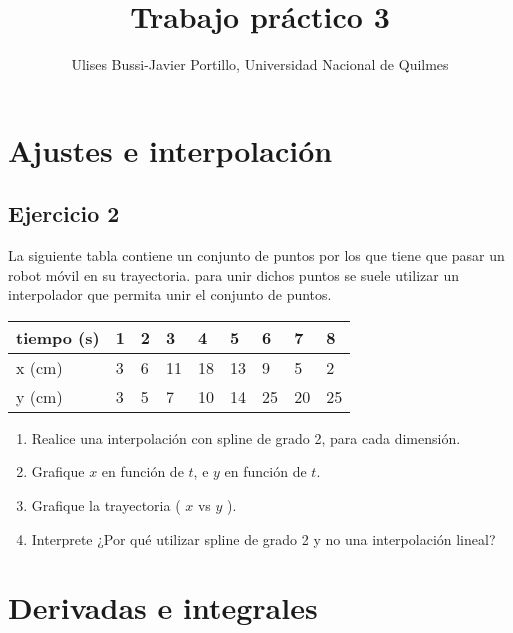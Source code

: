 \documentclass[a4paper,11pt]{article}
\makeatletter
\theoremstyle{mytheor}
\renewcommand{\maketitle}{
\colorbox{gray!20}{\framebox[\linewidth]{ \huge \textsc{\@title} } 
\lfoot{\@title}
}

}
\makeatother
\begin{document}
\title{Trabajo práctico 3}

\author{Ulises Bussi-Javier Portillo, Universidad Nacional de Quilmes}


\maketitle \vspace{20pt}

\section*{Ajustes e interpolación}

\subsection*{Ejercicio 2}
La siguiente tabla contiene un conjunto de puntos por los que tiene que pasar
un robot móvil en su trayectoria. para unir dichos puntos se suele utilizar
un interpolador que permita unir el conjunto de puntos. 

\begin{table}[h!]
\centering
\begin{tabular}{l|llllllll}
 \hline
 tiempo (s)   & 1	 &  2    &  3   &  4    &  5    &   6   &   7   &  8     \\ \hline
 x (cm) 	  & 3    &  6    &  11  &  18   & 13    &   9   &   5   &  2    \\ \hline
 y (cm) 	  & 3    &  5    &  7  &  10   & 14    &   25   &  20   &  25    \\ \hline
\end{tabular}
\end{table}


\begin{enumerate}[label=\alph*)]
  \item Realice una interpolación con spline de grado 2, para cada dimensión.
  \item Grafique $x$ en función de $t$, e $y$ en función de $t$.
  \item Grafique la trayectoria  ( $x$ vs $y$ ).
  \item Interprete ¿Por qué utilizar spline de grado 2 y no una interpolación lineal?
\end{enumerate} 





\section*{Derivadas e integrales}
%
\end{document}

